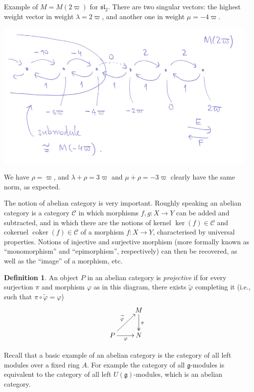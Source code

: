 \documentclass[12pt]{article}
\theoremstyle{plain}
\theoremstyle{definition}
\newtheorem{defn}{Definition}[section]
\numberwithin{equation}{section}
\DeclareMathOperator{\coker}{coker}
\newcommand{\wtil}[1]{\widetilde{#1}}
\newcommand{\la}{\lambda}
\newcommand{\g}{\mathfrak{g}}
\newcommand{\sll}{\mathfrak{sl}}
\newcommand{\CC}{\mathcal{C}}
\begin{document}
Example of $M = M(2\varpi)$ for $\sll_2$. There are two singular vectors: the highest weight vector in weight $\la = 2\varpi$, and another one in weight $\mu = -4\varpi$.
\begin{center}
\includegraphics[width=130mm]{M2-M-4-inclusion.png}
\end{center}
We have $\rho = \varpi$, and $\la+\rho = 3\varpi$ and $\mu+\rho = -3\varpi$ clearly have the same norm, as expected.


The notion of abelian category is very important. Roughly speaking an abelian category is a category $\CC$ in which morphisms $f, g : X \rightarrow Y$ can be added and subtracted, and in which there are the notions of kernel $\ker(f) \in \CC$ and cokernel $\coker(f) \in \CC$ of a morphism $f : X \rightarrow Y$, characterised by universal properties. Notions of injective and surjective morphism (more formally known as ``monomorphism'' and ``epimorphism'', respectively) can then be recovered, as well as the ``image'' of a morphism, etc.
\begin{defn}
An object $P$ in an abelian category is \emph{projective} if for every surjection $\pi$ and morphism $\varphi$ as in this diagram, there exists $\widetilde \varphi$ completing it (i.e., such that $\pi \circ \wtil{\varphi} = \varphi$)
\begin{align*}
\xymatrix{
 & M \ar@{->>}[d]^{\pi} \\
%
P \ar@{->}[r]_{\varphi} \ar@{->}[ur]^{\wtil{\varphi}} & N \\
}
\end{align*}
\end{defn}

Recall that a basic example of an abelian category is the category of all left modules over a fixed ring $A$. For example the category of all $\g$-modules is equivalent to the category of all left $U(\g)$-modules, which is an abelian category.
\end{document}
